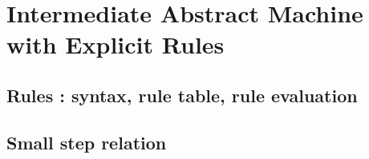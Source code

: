 \documentclass{article}
\begin{document}
\ottdefnsAbstractHighLevelSmallStep


\newpage
\section*{Intermediate Abstract Machine
  with Explicit Rules}

\subsection*{Rules : syntax, rule table, rule evaluation}

\ottgrammartabular{
\ottLE\ottinterrule
\ottBE\ottinterrule
\ottRHS\ottinterrule
}

\ottfundefnsRule
\ottdefnsRuleEvaluation
\clearpage

\subsection*{Small step relation}

\ottdefnsAbstractExplicitSmallStep
\end{document}

